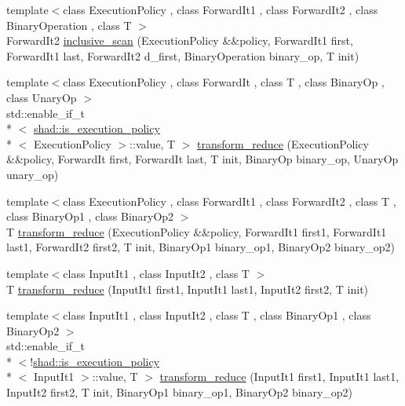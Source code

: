 \begin{DoxyCompactItemize}
\item 
{\footnotesize template$<$class Execution\-Policy , class Forward\-It1 , class Forward\-It2 , class Binary\-Operation , class T $>$ }\\Forward\-It2 \hyperlink{namespaceshad_ac268ceb6647308bdfa9a510f346cc560}{inclusive\-\_\-scan} (Execution\-Policy \&\&policy, Forward\-It1 first, Forward\-It1 last, Forward\-It2 d\-\_\-first, Binary\-Operation binary\-\_\-op, T init)
\item 
{\footnotesize template$<$class Execution\-Policy , class Forward\-It , class T , class Binary\-Op , class Unary\-Op $>$ }\\std\-::enable\-\_\-if\-\_\-t\\*
$<$ \hyperlink{structshad_1_1is__execution__policy}{shad\-::is\-\_\-execution\-\_\-policy}\\*
$<$ Execution\-Policy $>$\-::value, T $>$ \hyperlink{namespaceshad_a45c6b8c67b4d583819c334dc29a969b1}{transform\-\_\-reduce} (Execution\-Policy \&\&policy, Forward\-It first, Forward\-It last, T init, Binary\-Op binary\-\_\-op, Unary\-Op unary\-\_\-op)
\item 
{\footnotesize template$<$class Execution\-Policy , class Forward\-It1 , class Forward\-It2 , class T , class Binary\-Op1 , class Binary\-Op2 $>$ }\\T \hyperlink{namespaceshad_a9ada8d6b6cb63fd3b5b459ff608b5027}{transform\-\_\-reduce} (Execution\-Policy \&\&policy, Forward\-It1 first1, Forward\-It1 last1, Forward\-It2 first2, T init, Binary\-Op1 binary\-\_\-op1, Binary\-Op2 binary\-\_\-op2)
\item 
{\footnotesize template$<$class Input\-It1 , class Input\-It2 , class T $>$ }\\T \hyperlink{namespaceshad_a9fb77cb6187be97748be38c5632a406c}{transform\-\_\-reduce} (Input\-It1 first1, Input\-It1 last1, Input\-It2 first2, T init)
\item 
{\footnotesize template$<$class Input\-It1 , class Input\-It2 , class T , class Binary\-Op1 , class Binary\-Op2 $>$ }\\std\-::enable\-\_\-if\-\_\-t\\*
$<$!\hyperlink{structshad_1_1is__execution__policy}{shad\-::is\-\_\-execution\-\_\-policy}\\*
$<$ Input\-It1 $>$\-::value, T $>$ \hyperlink{namespaceshad_a6764e68a376e02ec492499b12eac8dc1}{transform\-\_\-reduce} (Input\-It1 first1, Input\-It1 last1, Input\-It2 first2, T init, Binary\-Op1 binary\-\_\-op1, Binary\-Op2 binary\-\_\-op2)
\item 

\end{DoxyCompactItemize}
